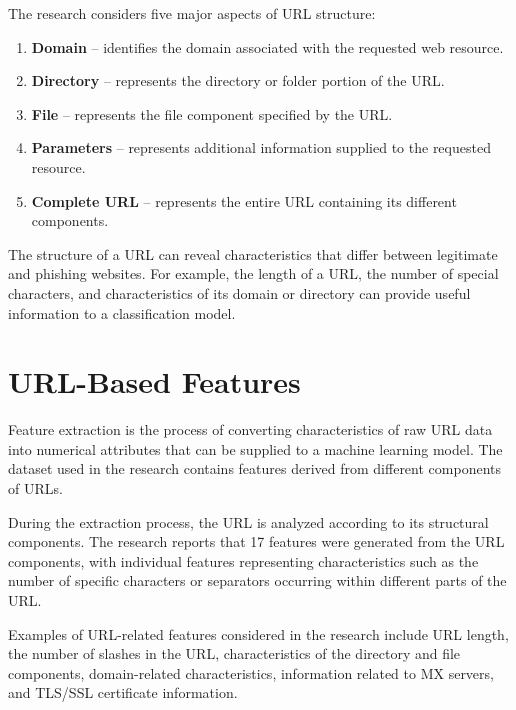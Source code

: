 \documentclass[12pt,a4paper]{report}
\begin{document}
The research considers five major aspects of URL structure:

\begin{enumerate}[label=\arabic*.]

    \item \textbf{Domain} -- identifies the domain associated with
    the requested web resource.

    \item \textbf{Directory} -- represents the directory or folder
    portion of the URL.

    \item \textbf{File} -- represents the file component specified
    by the URL.

    \item \textbf{Parameters} -- represents additional information
    supplied to the requested resource.

    \item \textbf{Complete URL} -- represents the entire URL
    containing its different components.

\end{enumerate}

The structure of a URL can reveal characteristics that differ
between legitimate and phishing websites. For example, the length
of a URL, the number of special characters, and characteristics of
its domain or directory can provide useful information to a
classification model.

\section{URL-Based Features}

Feature extraction is the process of converting characteristics of
raw URL data into numerical attributes that can be supplied to a
machine learning model. The dataset used in the research contains
features derived from different components of URLs.

During the extraction process, the URL is analyzed according to its
structural components. The research reports that 17 features were
generated from the URL components, with individual features
representing characteristics such as the number of specific
characters or separators occurring within different parts of the
URL.

Examples of URL-related features considered in the research include
URL length, the number of slashes in the URL, characteristics of the
directory and file components, domain-related characteristics,
information related to MX servers, and TLS/SSL certificate
information.
\end{document}
